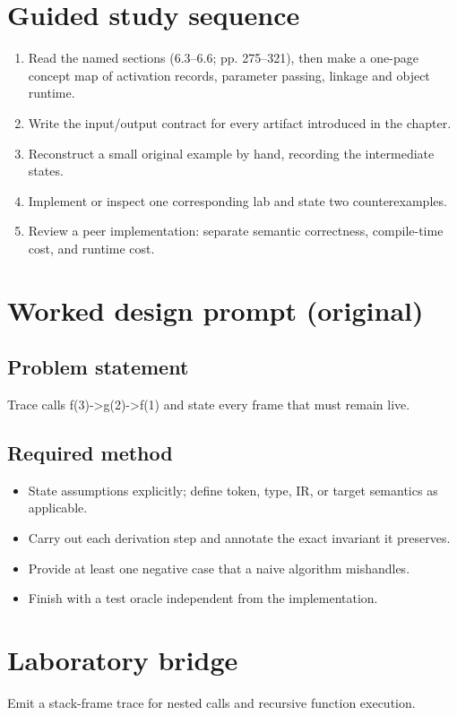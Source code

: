 \documentclass[10pt,letterpaper]{article}
\begin{document}
\section{Guided study sequence}
\begin{enumerate}
\item Read the named sections (6.3--6.6; pp. 275--321), then make a one-page concept map of activation records, parameter passing, linkage and object runtime.
\item Write the input/output contract for every artifact introduced in the chapter.
\item Reconstruct a small original example by hand, recording the intermediate states.
\item Implement or inspect one corresponding lab and state two counterexamples.
\item Review a peer implementation: separate semantic correctness, compile-time cost, and runtime cost.
\end{enumerate}

\section{Worked design prompt (original)}
\subsection{Problem statement}
Trace calls f(3)->g(2)->f(1) and state every frame that must remain live.
\subsection{Required method}
\begin{itemize}
\item State assumptions explicitly; define token, type, IR, or target semantics as applicable.
\item Carry out each derivation step and annotate the exact invariant it preserves.
\item Provide at least one negative case that a naive algorithm mishandles.
\item Finish with a test oracle independent from the implementation.
\end{itemize}


\section{Laboratory bridge}
Emit a stack-frame trace for nested calls and recursive function execution.
\end{document}
